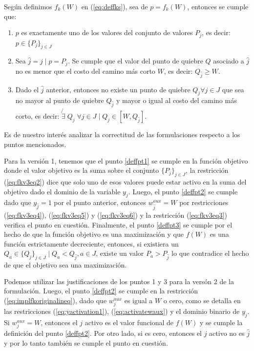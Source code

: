 \documentclass{article}
\begin{document}
  Según definimos $f_k(W)$ en (\ref{eq:deffks}), sea de $p = f_k(W)$, entonces se cumple que:

  \begin{enumerate}
    \item {\label{deffpt1} $p$ es exactamente uno de los valores del conjunto de valores $P_j$, es decir: $p \in \{P_j\}_{j \in J}$}
    \item {\label{deffpt2} Sea $\hat{j} = j \;|\; p = P_j$. Se cumple que el valor del punto de quiebre $Q$ asociado a $\hat{j}$ no es menor que el costo del camino más corto $W$, es decir: $Q_{\hat{j}} \geq W$.}
    \item {\label{deffpt3} Dado el $\hat{j}$ anterior, entonces no existe un punto de quiebre $Q_j \forall j \in J$ que sea no mayor al punto de quiebre $Q_{\hat{j}}$ y mayor o igual al costo del camino más corto, es decir: $\not{\exists}\; Q_j\; \forall j \in J \;|\; Q_j \in  [W, Q_{\hat{j}}]$}.
  \end{enumerate}

  Es de nuestro interés analizar la correctitud de las formulaciones respecto a los puntos mencionados.

  Para la versión 1, tenemos que el punto \ref{deffpt1} se cumple en la función objetivo donde el valor objetivo es la suma sobre el conjunto $\{P_j\}_{j \in J}$, la restricción (\ref{eq:fkv3eq2}) dice que solo uno de esos valores puede estar activo en la suma del objetivo dado el dominio de la variable $y_j$. Luego, el punto \ref{deffpt2} se cumple dado que $y_{\hat{j}} = 1$ por el punto anterior, entonces $w_{\hat{j}}^{aux} = W$ por restricciones (\ref{eq:fkv3eq4}), (\ref{eq:fkv3eq5}) y (\ref{eq:fkv3eq6}) y la restricción (\ref{eq:fkv3eq3}) verifica el punto en cuestión. Finalmente, el punto \ref{deffpt3} se cumple por el hecho de que la función objetivo es una maximización y que $f(W)$ es una función estrictamente decreciente, entonces, si existiera un $Q_a \in \{Q_j\}_{j \in J} \;|\; Q_a < Q_{\hat{j}}, a \in J$, existe un valor $P_a > P_{\hat{j}}$ lo que contradice el hecho de que el objetivo sea una maximización.

  Podemos utilizar las justificaciones de los puntos 1 y 3 para la versón 2 de la formulación. Luego, el punto \ref{deffpt2} se cumple en la restricción (\ref{eq:implfkoriginalineq}), dado que $w^{aux}_j$ es igual a $W$ o cero, como se detalla en las restricciones (\ref{eq:yactivation1}), (\ref{eq:activatewaux}) y el dominio binario de $y_j$. Si $w^{aux}_j = W$, entonces el $j$ activo es el valor funcional de $f(W)$ y se cumple la definición del punto \ref{deffpt2}. Por otro lado, si es cero, entonces el $j$ activo no es $\hat{j}$ y por lo tanto también se cumple el punto en cuestión.
\end{document}
